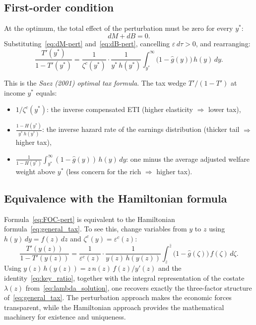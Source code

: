 \documentclass[12pt,a4paper]{article}
\theoremstyle{definition}
\theoremstyle{plain}
\theoremstyle{remark}
\newcommand{\zbar}{\bar{z}}
\begin{document}
\subsection{First-order condition}

At the optimum, the total effect of the perturbation must be zero
for every $y^*$:
\[
  dM + dB = 0.
\]
Substituting~\eqref{eq:dM-pert} and~\eqref{eq:dB-pert}, cancelling
$\varepsilon\,d\tau>0$, and rearranging:
\begin{equation}
\label{eq:FOC-pert}
  \boxed{
  \frac{T'(y^*)}{1-T'(y^*)}
  = \frac{1}{\zeta^c(y^*)}
  \cdot \frac{1}{y^*\,h(y^*)}
  \int_{y^*}^{\infty}
  \bigl(1-\hat g(y)\bigr)\,h(y)\,dy.
  }
\end{equation}

This is the \emph{Saez (2001) optimal tax formula}. The
tax wedge $T'/(1-T')$ at income $y^*$ equals:
\begin{itemize}
  \item $1/\zeta^c(y^*)$: the inverse compensated ETI
    (higher elasticity $\Rightarrow$ lower tax),
  \item $\displaystyle\frac{1-H(y^*)}{y^*\,h(y^*)}$: the
    inverse hazard rate of the earnings distribution
    (thicker tail $\Rightarrow$ higher tax),
  \item $\displaystyle\frac{1}{1-H(y^*)}\int_{y^*}^{\infty}
    (1-\hat g(y))\,h(y)\,dy$: one minus the average adjusted
    welfare weight above $y^*$ (less concern for the rich
    $\Rightarrow$ higher tax).
\end{itemize}

\subsection{Equivalence with the Hamiltonian formula}

Formula~\eqref{eq:FOC-pert} is equivalent to the Hamiltonian
formula~\eqref{eq:general_tax}. To see this, change variables
from $y$ to $z$ using $h(y)\,dy = f(z)\,dz$ and
$\zeta^c(y) = \varepsilon^c(z)$:
\[
  \frac{T'(y(z))}{1-T'(y(z))}
  = \frac{1}{\varepsilon^c(z)}
  \cdot \frac{1}{y(z)\,h(y(z))}
  \int_{z}^{\zbar}
  \bigl(1-\hat g(\zeta)\bigr)\,f(\zeta)\,d\zeta.
\]
Using $y(z)\,h(y(z)) = z\,n(z)\,f(z)/y'(z)$ and the
identity~\eqref{eq:key_ratio}, together with the integral
representation of the costate $\lambda(z)$
from~\eqref{eq:lambda_solution}, one recovers exactly the
three-factor structure of~\eqref{eq:general_tax}. The
perturbation approach makes the economic forces transparent,
while the Hamiltonian approach provides the mathematical
machinery for existence and uniqueness.
\end{document}
